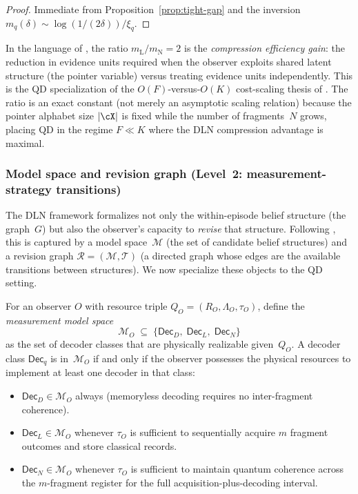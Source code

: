 \begin{proof}
Immediate from Proposition~\ref{prop:tight-gap} and the inversion
$m_q(\delta) \sim \log(1/(2\delta)) / \xi_q$.
\end{proof}


\begin{remark}
\label{rem:compression}
In the language of \citep{WuDLNCompression2026preprint}, the ratio
$m_{\mathrm{L}}/m_{\mathrm{N}}=2$ is the \emph{compression efficiency
gain}: the reduction in evidence units required when the observer
exploits shared latent structure (the pointer variable) versus treating
evidence units independently.
This is the QD specialization of the $O(F)$-versus-$O(K)$ cost-scaling
thesis of \citep[Proposition~1(i)]{WuDLNCompression2026preprint}.
The ratio is an exact constant (not merely an asymptotic scaling
relation) because the pointer alphabet size $|\cX|$ is fixed while the
number of fragments~$N$ grows, placing QD in the regime $F\ll K$ where
the DLN compression advantage is maximal.
\end{remark}


\subsubsection{Model space and revision graph
              (Level~2: measurement-strategy transitions)}
\label{sec:revision-qd}

The DLN framework formalizes not only the within-episode belief structure
(the graph~$G$) but also the observer's capacity to \emph{revise} that
structure.
Following \citep[Sec.~2.3]{WuDLNCompression2026preprint}, this is
captured by a model space~$\mathcal{M}$ (the set of candidate belief
structures) and a revision graph $\mathcal{R}=(\mathcal{M},\mathcal{T})$
(a directed graph whose edges are the available transitions between
structures).
We now specialize these objects to the QD setting.

\begin{definition}
\label{def:model-space-qd}
For an observer $O$ with resource triple
$Q_O=(R_O,\Lambda_O,\tau_O)$, define the
\emph{measurement model space}
\[
  \mathcal{M}_O \;\subseteq\;
  \{\mathsf{Dec}_D,\;\mathsf{Dec}_L,\;\mathsf{Dec}_N\}
\]
as the set of decoder classes that are physically realizable
given~$Q_O$.
A decoder class $\mathsf{Dec}_q$ is in~$\mathcal{M}_O$ if and only if
the observer possesses the physical resources to implement at least one
decoder in that class:
\begin{itemize}
\item $\mathsf{Dec}_D\in\mathcal{M}_O$ always
  (memoryless decoding requires no inter-fragment coherence).
\item $\mathsf{Dec}_L\in\mathcal{M}_O$ whenever $\tau_O$ is sufficient
  to sequentially acquire $m$ fragment outcomes and store classical
  records.
\item $\mathsf{Dec}_N\in\mathcal{M}_O$ whenever $\tau_O$ is sufficient
  to maintain quantum coherence across the $m$-fragment register for
  the full acquisition-plus-decoding interval.
\end{itemize}
\end{definition}


